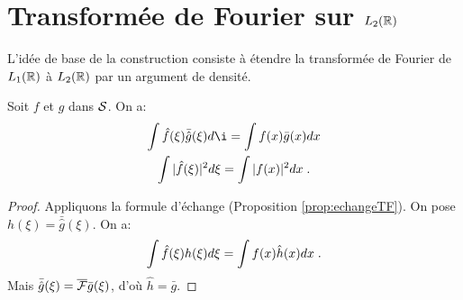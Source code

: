 \section{Transform{\'e}e de Fourier sur $L_2(\mathbb{R})$}
L'id{\'e}e de base de la construction consiste {\`a} {\'e}tendre la transform{\'e}e de Fourier
de $L_1(\mathbb{R})$ {\`a} $L_2(\mathbb{R})$ par un argument de densit{\'e}.
\begin{proposition}
\label{prop:plancherelparseval}
Soit $f$ et $g$ dans $\mathcal{S}$. On a:
\begin{gather*}
\int \hat{f}(\xi) \bar{\hat{g}}(\xi) d \i = \int f(x) \bar{g}(x) dx \\
\int |\hat{f}(\xi)|^2 d \xi = \int |f(x)|^2 dx \eqsp.
\end{gather*}
\end{proposition}
\begin{proof}
Appliquons la formule d'{\'e}change (Proposition \ref{prop:echangeTF}). On pose $h(\xi)= \bar{\hat{g}}(\xi)$. On a:
$$
\int \hat{f}(\xi) h(\xi) d \xi = \int f(x) \hat{h}(x) dx \;.
$$
Mais $\bar{\hat{g}}(\xi)= \overline{\mathcal{F}} \bar{g}(\xi)$, d'o{\`u} $\hat{h}= \bar{g}$.
\end{proof}

